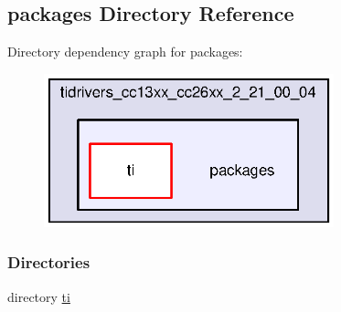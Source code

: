 \subsection{packages Directory Reference}
\label{dir_e878ca508aca5c2adbeed7fe0aa36dc1}
Directory dependency graph for packages\+:
\nopagebreak
\begin{figure}[H]
\begin{center}
\leavevmode
\includegraphics[width=238pt]{dir_e878ca508aca5c2adbeed7fe0aa36dc1_dep}
\end{center}
\end{figure}
\subsubsection*{Directories}
\begin{DoxyCompactItemize}
\item 
directory \hyperlink{dir_70f8dd04fa908b53b701dc5cf6df255f}{ti}
\end{DoxyCompactItemize}
